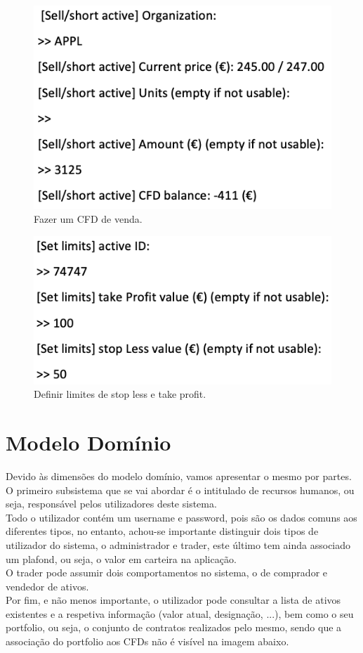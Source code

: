 \documentclass[11pt,a4paper]{report}%
\begin{document}
\begin{figure}[H]
	\centering
	\includegraphics[scale=0.6]{ui6.png}
	\caption{Fazer um CFD de venda. }
	\label{img:pag}
\end{figure}

\begin{figure}[H]
	\centering
	\includegraphics[scale=0.6]{ui7.png}
	\caption{Definir limites de stop less e take profit. }
	\label{img:pag}
\end{figure}

\newpage

\section{Modelo Domínio}

Devido às dimensões do modelo domínio, vamos apresentar o mesmo por partes. O primeiro subsistema que se vai abordar é o intitulado de recursos humanos, ou seja, responsável pelos utilizadores deste sistema. \\Todo o utilizador contém um username e password, pois são os dados comuns aos diferentes tipos, no entanto, achou-se importante distinguir dois tipos de utilizador do sistema, o administrador e trader, este último tem ainda associado um plafond, ou seja, o valor em carteira na aplicação. \\O trader pode assumir dois comportamentos no sistema, o de comprador e vendedor de ativos.\\
Por fim, e não menos importante, o utilizador pode consultar a lista de ativos existentes e a respetiva informação (valor atual, designação, ...), bem como o seu portfolio, ou seja, o conjunto de contratos realizados pelo mesmo, sendo que a associação do portfolio aos CFDs não é visível na imagem abaixo.
\end{document}
